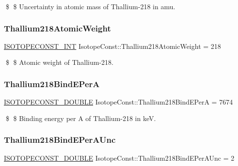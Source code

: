 \$ \$ Uncertainty in atomic mass of Thallium-\/218 in amu. \mbox{\label{group___isotope_const-_thallium-_tl218_gad85be732c26e662fcf2dbb1d553fb847}} 
\subsubsection{\texorpdfstring{Thallium218\+Atomic\+Weight}{Thallium218AtomicWeight}}
{\footnotesize\ttfamily \mbox{\hyperlink{group___isotope_const-_macros_ga5f18360b3e99483a35c32d789e62621c}{I\+S\+O\+T\+O\+P\+E\+C\+O\+N\+S\+T\+\_\+\+I\+NT}} Isotope\+Const\+::\+Thallium218\+Atomic\+Weight = 218}

\$ \$ Atomic weight of Thallium-\/218. \mbox{\label{group___isotope_const-_thallium-_tl218_gac3face8712bbf76633a0efd7a4b4a628}} 
\subsubsection{\texorpdfstring{Thallium218\+Bind\+E\+PerA}{Thallium218BindEPerA}}
{\footnotesize\ttfamily \mbox{\hyperlink{group___isotope_const-_macros_ga8f45a7272ce02c0b4c65c44636ed719a}{I\+S\+O\+T\+O\+P\+E\+C\+O\+N\+S\+T\+\_\+\+D\+O\+U\+B\+LE}} Isotope\+Const\+::\+Thallium218\+Bind\+E\+PerA = 7674}

\$ \$ Binding energy per A of Thallium-\/218 in keV. \mbox{\label{group___isotope_const-_thallium-_tl218_ga5162e5f67b441a47f7a946d9bd8de4a5}} 
\subsubsection{\texorpdfstring{Thallium218\+Bind\+E\+Per\+A\+Unc}{Thallium218BindEPerAUnc}}
{\footnotesize\ttfamily \mbox{\hyperlink{group___isotope_const-_macros_ga8f45a7272ce02c0b4c65c44636ed719a}{I\+S\+O\+T\+O\+P\+E\+C\+O\+N\+S\+T\+\_\+\+D\+O\+U\+B\+LE}} Isotope\+Const\+::\+Thallium218\+Bind\+E\+Per\+A\+Unc = 2}

